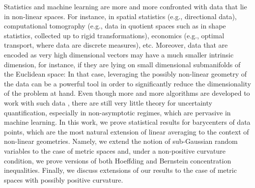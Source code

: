 \documentclass[10pt,a4paper]{article}
\theoremstyle{plain}
\theoremstyle{definition}
\theoremstyle{remark}
\begin{document}
Statistics and machine learning are more and more confronted with data that lie in non-linear spaces. For instance, in spatial statistics (e.g., directional data), computational tomography (e.g., data in quotient spaces such as in shape statistics, collected up to rigid transformations), economics (e.g., optimal transport, where data are discrete measures), etc. Moreover, data that are encoded as very high dimensional vectors may have a much smaller intrinsic dimension, for instance, if they are lying on small dimensional submanifolds of the Euclidean space: In that case, leveraging the possibly non-linear geometry of the data can be a powerful tool in order to significantly reduce the dimensionality of the problem at hand. Even though more and more algorithms are developed to work with such data \cite{LimPalfia14,ohtapalfia,zhang2016first,zhang2018towards}, there are still very little theory for uncertainty quantification, especially in non-asymptotic regimes, which are pervasive in machine learning. In this work, we prove statistical results for barycenters of data points, which are the most natural extension of linear averaging to the context of non-linear geometries. Namely, we extend the notion of sub-Gaussian random variables to the case of metric spaces and, under a non-positive curvature condition, we prove versions of both Hoeffding and Bernstein concentration inequalities. Finally, we discuss extensions of our results to the case of metric spaces with possibly positive curvature. 
\end{document}
